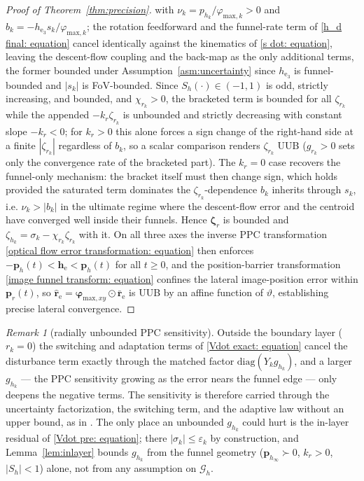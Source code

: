 \documentclass{IEEEtaes}
\theoremstyle{definition}
\theoremstyle{remark}
\newtheorem{remark}{Remark}
\begin{document}
\begin{proof}[Proof of Theorem~\ref{thm:precision}]
with $\nu_k=p_{h_k}/\varphi_{\text{max},k}>0$ and $b_k=-h_{\text{e}_3}s_k/\varphi_{\text{max},k}$; the rotation feedforward and the funnel-rate term of \eqref{h_d final: equation} cancel identically against the kinematics of \eqref{s dot: equation}, leaving the descent-flow coupling and the back-map as the only additional terms, the former bounded under Assumption~\ref{asm:uncertainty} since $h_{\text{e}_3}$ is funnel-bounded and $|s_k|$ is FoV-bounded. Since $S_h(\cdot)\in(-1,1)$ is odd, strictly increasing, and bounded, and $\chi_{r_k}>0$, the bracketed term is bounded for all $\zeta_{r_k}$ while the appended $-k_r\zeta_{r_k}$ is unbounded and strictly decreasing with constant slope $-k_r<0$; for $k_r>0$ this alone forces a sign change of the right-hand side at a finite $|\zeta_{r_k}|$ regardless of $b_k$, so a scalar comparison renders $\zeta_{r_k}$ UUB ($g_{r_k}>0$ sets only the convergence rate of the bracketed part). The $k_r=0$ case recovers the funnel-only mechanism: the bracket itself must then change sign, which holds provided the saturated term dominates the $\zeta_{r_k}$-dependence $b_k$ inherits through $s_k$, i.e. $\nu_k>|b_k|$ in the ultimate regime where the descent-flow error and the centroid have converged well inside their funnels. Hence $\boldsymbol{\zeta}_r$ is bounded and $\zeta_{h_k}=\sigma_k-\chi_{r_k}\zeta_{r_k}$ with it. On all three axes the inverse PPC transformation \eqref{optical flow error transformation: equation} then enforces $-\boldsymbol{p}_h(t)<\boldsymbol{h}_\text{e}<\boldsymbol{p}_h(t)$ for all $t\ge 0$, and the position-barrier transformation \eqref{image funnel transform: equation} confines the lateral image-position error within $\boldsymbol{p}_r(t)$, so $\hat{\boldsymbol{r}}_\text{e}=\boldsymbol{\varphi}_{\text{max},xy}\odot\bar{\boldsymbol{r}}_\text{e}$ is UUB by an affine function of $\vartheta$, establishing precise lateral convergence. \end{proof}

\begin{remark}[radially unbounded PPC sensitivity]\label{rem:radial}
Outside the boundary layer ($r_k=0$) the switching and adaptation terms of \eqref{Vdot exact: equation} cancel the disturbance term exactly through the matched factor $\mathrm{diag}(Y_k g_{h_k})$, and a larger $g_{h_k}$ --- the PPC sensitivity growing as the error nears the funnel edge --- only deepens the negative terms. The sensitivity is therefore carried through the uncertainty factorization, the switching term, and the adaptive law without an upper bound, as in \cite{singhal2025}. The only place an unbounded $g_{h_k}$ could hurt is the in-layer residual of \eqref{Vdot pre: equation}; there $|\sigma_k|\le\varepsilon_k$ by construction, and Lemma~\ref{lem:inlayer} bounds $g_{h_k}$ from the funnel geometry ($\boldsymbol{p}_{h_\infty}\succ0$, $k_r>0$, $|S_h|<1$) alone, not from any assumption on $\mathcal{G}_h$.
\end{remark}
\end{document}
